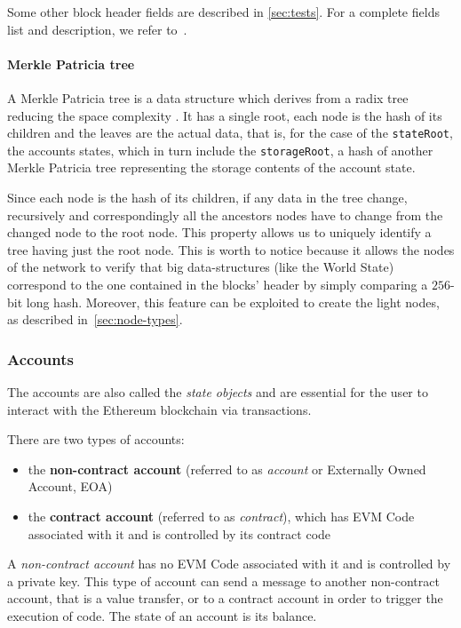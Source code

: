 Some other block header fields are described in \autoref{sec:tests}. For a
complete fields list and description, we refer to~\cite{wood2018ethereum}.

\paragraph{Merkle Patricia tree} A Merkle Patricia tree is a data structure
which derives from a radix tree reducing the space complexity
\cite{patriciatree}. It has a single root, each node is the hash of its children
and the leaves are the actual data, that is, for the case of the
\verb+stateRoot+, the accounts states, which in turn include the
\verb+storageRoot+, a hash of another Merkle Patricia tree representing the
storage contents of the account state.

Since each node is the hash of its children, if any data in the tree change,
recursively and correspondingly all the ancestors nodes have to change from the
changed node to the root node. This property allows us to uniquely identify a
tree having just the root node. This is worth to notice because it allows the
nodes of the network to verify that big data-structures (like the World State)
correspond to the one contained in the blocks' header by simply comparing a
$256$-bit long hash. Moreover, this feature can be exploited to create the light
nodes, as described in~\autoref{sec:node-types}.


\subsubsection{Accounts}
\label{sec:accounts}

The accounts are also called the \emph{state objects} and are essential for the
user to interact with the Ethereum blockchain via transactions.

There are two types of accounts:

\begin{itemize}
  \item the \textbf{non-contract account} (referred to as \emph{account} or
  Externally Owned Account, EOA)
  \item the \textbf{contract account} (referred to as \emph{contract}), which
  has EVM Code associated with it and is controlled by its contract code
\end{itemize}

A \emph{non-contract account} has no EVM Code associated with it and is
controlled by a private key. This type of account can send a message to another
non-contract account, that is a value transfer, or to a contract account in
order to trigger the execution of code. The state of an account is its balance.

